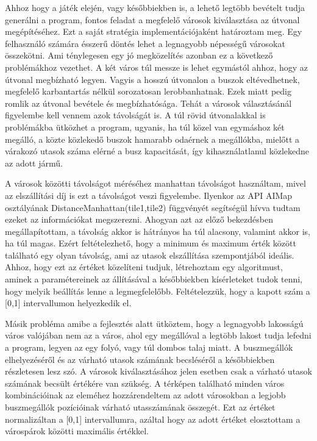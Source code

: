 
Ahhoz hogy a játék elején, vagy későbbiekben is, a lehető legtöbb bevételt tudja generálni a program, fontos feladat a megfelelő városok kiválasztása az útvonal megépítéséhez. Ezt a saját stratégia implementációjaként határoztam meg. Egy felhasználó számára ésszerű döntés lehet a legnagyobb népességű városokat összekötni. Ami ténylegesen egy jó megközelítés azonban ez a következő problémákhoz vezethet. A két város túl messze is lehet egymástól ahhoz, hogy az útvonal megbízható legyen. Vagyis a hosszú útvonalon a buszok eltévedhetnek, megfelelő karbantartás nélkül sorozatosan lerobbanhatnak. Ezek miatt pedig romlik az útvonal bevétele és megbízhatósága. Tehát a városok választásánál figyelembe kell vennem azok távolságát is. A túl rövid útvonalakkal is problémákba ütközhet a program, ugyanis, ha túl közel van egymáshoz két megálló, a közte közlekedő buszok hamarabb odaérnek a megállókba, mielőtt a várakozó utasok száma elérné a busz kapacitását, így kihasználatlanul közlekedne az adott jármű.

A városok közötti távolságot méréséhez manhattan távolságot használtam, mivel az elszállítási díj is ezt a távolságot veszi figyelembe. Ilyenkor az API AIMap osztályának DistanceManhattan(tile1,tile2) függvényét segítségül hívva tudtam ezeket az információkat megszerezni. Ahogyan azt az előző bekezdésben megállapítottam, a távolság akkor is hátrányos ha túl alacsony, valamint akkor is, ha túl magas. Ezért feltételezhető, hogy a minimum és maximum érték között található egy olyan távolság, ami az utasok elszállítása szempontjából ideális. Ahhoz, hogy ezt az értéket közelíteni tudjuk, létrehoztam egy algoritmust, aminek a paramétereinek az állításával a későbbiekben kísérleteket tudok tenni, hogy melyik beállítás lenne a legmegfelelőbb. Feltételezzük, hogy a kapott szám a [0,1] intervallumon helyezkedik el.

Másik probléma amibe a fejlesztés alatt ütköztem, hogy a legnagyobb lakosságú város valójában nem az a város, ahol egy megállóval a legtöbb lakost tudja lefedni a program, legyen az egy folyó, vagy túl dombos talaj miatt. A buszmegállók elhelyezéséről és az várható utasok számának becsléséről a későbbiekben részletesen lesz szó. A városok kiválasztásához jelen esetben csak a várható utasok számának becsült értékére van szükség. A térképen található minden város kombinációinak az eleméhez hozzárendeltem az adott városokban a legjobb buszmegállók pozícióinak várható utasszámának összegét. Ezt az értéket normalizáltan a [0,1] intervallumra, azáltal hogy az adott értéket elosztottam a várospárok közötti maximális értékkel.


